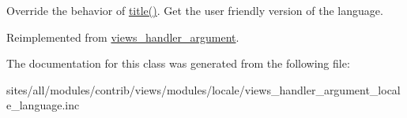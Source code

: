 Override the behavior of \hyperlink{classviews__handler__argument__locale__language_87bfadf6710bcc6bee4f734d258e7407}{title()}. Get the user friendly version of the language. 

Reimplemented from \hyperlink{classviews__handler__argument_76181ac24e7be4a09aaafc1fa5f15ea1}{views\_\-handler\_\-argument}.

The documentation for this class was generated from the following file:\begin{CompactItemize}
\item 
sites/all/modules/contrib/views/modules/locale/views\_\-handler\_\-argument\_\-locale\_\-language.inc\end{CompactItemize}
